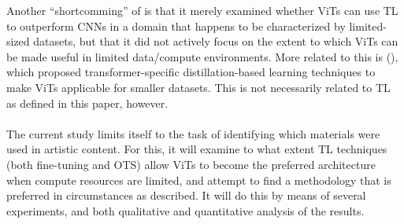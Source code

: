 Another ``shortcomming'' of \citeauthor{matsoukas2021time} is that it merely examined whether ViTs can use TL to outperform CNNs in a domain that happens to be characterized by limited-sized datasets, but that it did not actively focus on the extent to which ViTs can be made useful in limited data/compute environments. More related to this is \citeauthor{touvron2021training} (\citeyear{touvron2021training}), which proposed transformer-specific distillation-based learning techniques to make ViTs applicable for smaller datasets. This is not necessarily related to TL as defined in this paper, however.
\\\\
The current study limits itself to the task of identifying which materials were used in artistic content. For this, it will examine to what extent TL techniques (both fine-tuning and OTS) allow ViTs to become the preferred architecture when compute resources are limited, and attempt to find a methodology that is preferred in circumstances as described. It will do this by means of several experiments, and both qualitative and quantitative analysis of the results.


